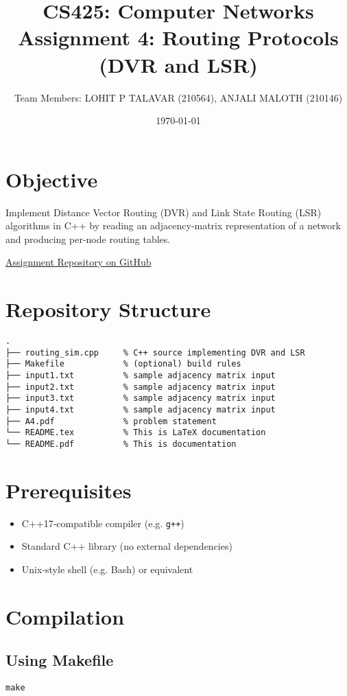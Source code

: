 \documentclass[12pt]{article}
\title{CS425: Computer Networks\\Assignment 4: Routing Protocols (DVR and LSR)}
\author{Team Members: LOHIT P TALAVAR (210564), ANJALI MALOTH (210146)}
\date{\today}
\begin{document}
\maketitle

\section*{Objective}
Implement Distance Vector Routing (DVR) and Link State Routing (LSR) algorithms in C++ by reading an adjacency‐matrix representation of a network and producing per‐node routing tables.

\href{https://github.com/lohitpt252003/CS425-2025.git}{Assignment Repository on GitHub}

\section*{Repository Structure}
\begin{verbatim}
.
├── routing_sim.cpp     % C++ source implementing DVR and LSR
├── Makefile            % (optional) build rules
├── input1.txt          % sample adjacency matrix input
├── input2.txt          % sample adjacency matrix input
├── input3.txt          % sample adjacency matrix input
├── input4.txt          % sample adjacency matrix input
├── A4.pdf              % problem statement
└── README.tex          % This is LaTeX documentation
└── README.pdf          % This is documentation
\end{verbatim}

\section*{Prerequisites}
\begin{itemize}
  \item C++17‑compatible compiler (e.g. \texttt{g++})
  \item Standard C++ library (no external dependencies)
  \item Unix‑style shell (e.g. Bash) or equivalent
\end{itemize}

\newpage

\section*{Compilation}
\subsection*{Using Makefile}
\begin{verbatim}
make
\end{verbatim}
\end{document}
